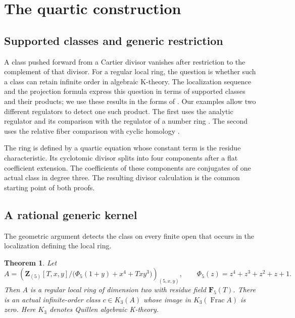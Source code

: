 \documentclass[11pt,a4paper]{amsart}
\numberwithin{equation}{section}
\newtheorem{theorem}{Theorem}[section]
\theoremstyle{definition}
\theoremstyle{remark}
\newcommand{\DtwoZZ}{\mathbf{Z}}
\newcommand{\DtwoFF}{\mathbf{F}}
\DeclareMathOperator{\DtwoFrac}{Frac}
\begin{document}


\section{The quartic construction}\label{d2:sec:introduction}

\subsection*{Supported classes and generic restriction}

A class pushed forward from a Cartier divisor vanishes after restriction to the complement of that divisor. For a regular local ring, the question is whether such a class can retain infinite order in algebraic K-theory. The localization sequence and the projection formula express this question in terms of supported classes and their products; we use these results in the forms of \cite[V.3--V.6]{Weibel}. Our examples allow two different regulators to detect one such product. The first uses the analytic regulator and its comparison with the regulator of a number ring \cite{Borel,BunkeTamme}. The second uses the relative fiber comparison with cyclic homology \cite{AMMN,BGTTrace}.

The ring is defined by a quartic equation whose constant term is the residue characteristic. Its cyclotomic divisor splits into four components after a flat coefficient extension. The coefficients of these components are conjugates of one actual class in degree three. The resulting divisor calculation is the common starting point of both proofs.

\subsection{A rational generic kernel}

The geometric argument detects the class on every finite open that occurs in the localization defining the local ring.

\begin{theorem}\label{d2:thm:geometric}
Let
\[
 A=
 \left(
 \DtwoZZ_{(5)}[T,x,y]/
 \bigl(\Phi _5(1+y)+x^4+Txy^3\bigr)
 \right)_{(5,x,y)},
 \qquad
 \Phi _5(z)=z^4+z^3+z^2+z+1.
\]
Then \(A\) is a regular local ring of dimension two with residue field
\(\DtwoFF _5(T)\). There is an actual infinite-order class
\(c\in K_3(A)\) whose image in \(K_3(\DtwoFrac A)\) is zero.
Here \(K_3\) denotes Quillen algebraic K-theory.
\end{theorem}
\end{document}
